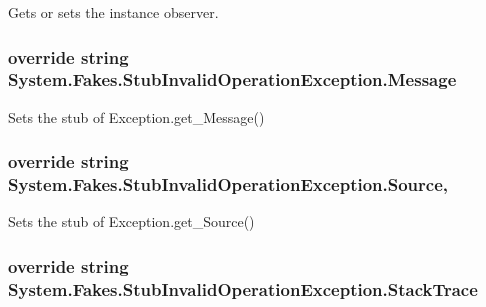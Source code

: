 Gets or sets the instance observer.

\hypertarget{class_system_1_1_fakes_1_1_stub_invalid_operation_exception_a874c9541edb366cb15bcda28e1be1ded}{
\subsubsection[{Message}]{\setlength{\rightskip}{0pt plus 5cm}override string System.\-Fakes.\-Stub\-Invalid\-Operation\-Exception.\-Message\hspace{0.3cm}{\ttfamily [get]}}}\label{class_system_1_1_fakes_1_1_stub_invalid_operation_exception_a874c9541edb366cb15bcda28e1be1ded}


Sets the stub of Exception.\-get\-\_\-\-Message()

\hypertarget{class_system_1_1_fakes_1_1_stub_invalid_operation_exception_a01bff8a7ff7aba65094e0d033f0f1834}{
\subsubsection[{Source}]{\setlength{\rightskip}{0pt plus 5cm}override string System.\-Fakes.\-Stub\-Invalid\-Operation\-Exception.\-Source\hspace{0.3cm}{\ttfamily [get]}, {\ttfamily [set]}}}\label{class_system_1_1_fakes_1_1_stub_invalid_operation_exception_a01bff8a7ff7aba65094e0d033f0f1834}


Sets the stub of Exception.\-get\-\_\-\-Source()

\hypertarget{class_system_1_1_fakes_1_1_stub_invalid_operation_exception_ae891a709eadf25283e5bf129a778da4f}{
\subsubsection[{Stack\-Trace}]{\setlength{\rightskip}{0pt plus 5cm}override string System.\-Fakes.\-Stub\-Invalid\-Operation\-Exception.\-Stack\-Trace\hspace{0.3cm}{\ttfamily [get]}}}\label{class_system_1_1_fakes_1_1_stub_invalid_operation_exception_ae891a709eadf25283e5bf129a778da4f}



